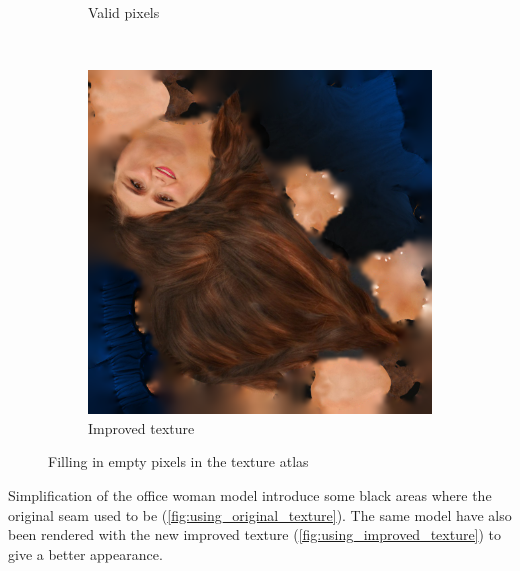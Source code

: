 \begin{figure}[h]
\begin{subfigure}[b]{.3\textwidth}
    \caption{Valid pixels}
    \label{fig:valid_pixels}
  \end{subfigure}
  ~
  \begin{subfigure}[b]{.3\textwidth}
    \includegraphics[width=\textwidth]{figures/woman_output.png}
    \caption{Improved texture}
    \label{fig:improved_texture}
  \end{subfigure}
  \caption{Filling in empty pixels in the texture atlas}
  \label{fig:improve_texture_atlas}
\end{figure}

Simplification of the office woman model introduce some black areas where the original seam used to be (\cref{fig:using_original_texture}). The same model have also been rendered with the new improved texture (\cref{fig:using_improved_texture}) to give a better appearance.

